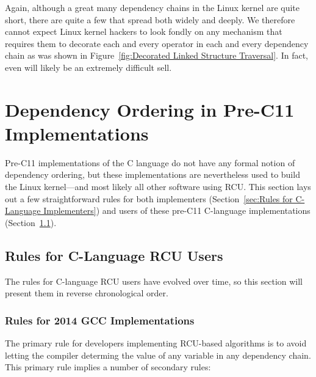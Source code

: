 \documentclass[letterpaper,twocolumn,10pt]{article}
\begin{document}
Again, although a great many dependency chains in the Linux kernel
are quite short, there are quite a few that spread both widely and deeply.
We therefore cannot expect Linux kernel hackers to look fondly on
any mechanism that requires them to decorate each and every operator
in each and every dependency chain as was shown in
Figure~\ref{fig:Decorated Linked Structure Traversal}.
In fact, even  will likely be
an extremely difficult sell.

\section{Dependency Ordering in Pre-C11 Implementations}
\label{sec:Dependency Ordering in Pre-C11 Implementations}

Pre-C11 implementations of the C language do not have any formal
notion of dependency ordering, but these implementations are
nevertheless used to build the Linux kernel---and most likely
all other software using RCU.
This section lays out a few straightforward rules for both
implementers (Section~\ref{sec:Rules for C-Language Implementers})
and users of these pre-C11 C-language implementations
(Section~\ref{sec:Rules for C-Language RCU Users}).

\subsection{Rules for C-Language RCU Users}
\label{sec:Rules for C-Language RCU Users}

The rules for C-language RCU users have evolved over time, so this
section will present them in reverse chronological order.

\subsubsection{Rules for 2014 GCC Implementations}
\label{sec:Rules for 2014 GCC Implementations}

The primary rule for developers implementing RCU-based algorithms
is to avoid letting the compiler determing the value of any variable
in any dependency chain.
This primary rule implies a number of secondary rules:
\end{document}
